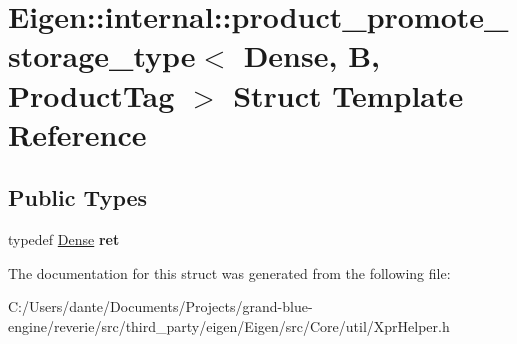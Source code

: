 \hypertarget{struct_eigen_1_1internal_1_1product__promote__storage__type_3_01_dense_00_01_b_00_01_product_tag_01_4}{}\section{Eigen\+::internal\+::product\+\_\+promote\+\_\+storage\+\_\+type$<$ Dense, B, Product\+Tag $>$ Struct Template Reference}
\label{struct_eigen_1_1internal_1_1product__promote__storage__type_3_01_dense_00_01_b_00_01_product_tag_01_4}
\subsection*{Public Types}
\begin{DoxyCompactItemize}
\item 
\mbox{\label{struct_eigen_1_1internal_1_1product__promote__storage__type_3_01_dense_00_01_b_00_01_product_tag_01_4_ac3a1efea82c04a784a4a91c24f4a24be}} 
typedef \mbox{\hyperlink{struct_eigen_1_1_dense}{Dense}} {\bfseries ret}
\end{DoxyCompactItemize}


The documentation for this struct was generated from the following file\+:\begin{DoxyCompactItemize}
\item 
C\+:/\+Users/dante/\+Documents/\+Projects/grand-\/blue-\/engine/reverie/src/third\+\_\+party/eigen/\+Eigen/src/\+Core/util/Xpr\+Helper.\+h\end{DoxyCompactItemize}
